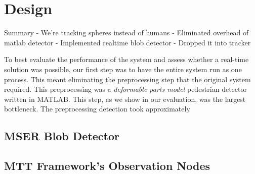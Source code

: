 \section{Design}
\label{sec:design}

Summary
- We're tracking spheres instead of humans
- Eliminated overhead of matlab detector
- Implemented realtime blob detector
- Dropped it into tracker

To best evaluate the performance of the system and assess whether a real-time solution was possible, our first step was to have
the entire system run as one process. This meant eliminating the preprocessing step that the original system required. This
preprocessing was a \emph{deformable parts model} pedestrian detector written in MATLAB. This step, as we show in our
evaluation, was the largest bottleneck. The preprocessing detection took approximately 

\subsection{MSER Blob Detector}

\subsection{MTT Framework's Observation Nodes}
